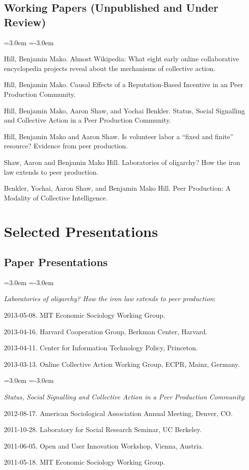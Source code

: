 \documentclass[10pt]{article}
\newenvironment{cvlist}{
\begin{list}{}{\leftmargin=3.0em \itemindent=-3.0em}
  \setlength{\itemsep}{0pt}
  \setlength{\parskip}{0em}
  \setlength{\parsep}{1em}
  \setlength{\parindent}{0em}}
{\vspace{1em}
\end{list}}
\begin{document}
\subsection{Working Papers (Unpublished and Under Review)}
\begin{cvlist}
\item Hill, Benjamin Mako. Almost Wikipedia: What eight early online collaborative encyclopedia projects reveal about the mechanisms of collective action.
\item Hill, Benjamin Mako. Causal Effects of a Reputation-Based Incentive in an Peer Production Community.
\item Hill, Benjamin Mako, Aaron Shaw, and Yochai Benkler. Status, Social Signalling and Collective Action in a Peer Production Community.
\item Hill, Benjamin Mako and Aaron Shaw. Is volunteer labor a ``fixed and finite'' resource? Evidence from peer production.
\item Shaw, Aaron and Benjamin Mako Hill. Laboratories of oligarchy? How the iron law extends to peer production.
\item Benkler, Yochai, Aaron Shaw, and Benjamin Mako Hill. Peer Production: A Modality of Collective Intelligence.
\end{cvlist}

\section{Selected Presentations}

\subsection{Paper Presentations}

\begin{cvlist}
\item \emph{Laboratories of oligarchy? How the iron law extends to peer production}:
\item 2013-05-08. MIT Economic Sociology Working Group.
\item 2013-04-16. Harvard Cooperation Group, Berkman Center, Harvard.
\item 2013-04-11. Center for Information Technology Policy, Princeton.
\item 2013-03-13. Online Collective Action Working Group, ECPR, Mainz, Germany.
\end{cvlist}

\begin{cvlist}
\item \emph{Status, Social Signalling and Collective Action in a Peer Production Community}:
\item 2012-08-17. American Sociological Association Annual Meeting, Denver, CO.
\item 2011-10-28. Laboratory for Social Research Seminar, UC Berkeley.
\item 2011-06-05. Open and User Innovation Workshop, Vienna, Austria.
\item 2011-05-18. MIT Economic Sociology Working Group.
\end{cvlist}
\end{document}
